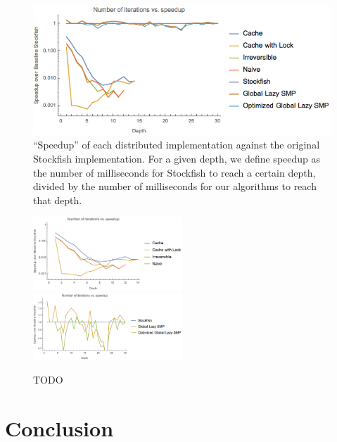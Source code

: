 \documentclass{article}
\begin{document}
\begin{figure}
	\includegraphics[width=\textwidth]{../plots/speedup}
	\caption{``Speedup'' of each distributed implementation against the
	original Stockfish implementation. For a given depth, we define speedup
	as the number of milliseconds for Stockfish to reach a certain depth,
	divided by the number of milliseconds for our algorithms to reach that
	depth.}
	\label{fig:speedup}
\end{figure}

\begin{figure}
	\includegraphics[width=0.5\textwidth]{../plots/speedup_bad}
	\includegraphics[width=0.5\textwidth]{../plots/speedup_good}
	\caption{TODO}
	\label{fig:speedup-separate}
\end{figure}





\section{Conclusion}


\pagebreak
\pagestyle{empty}



\end{document}
